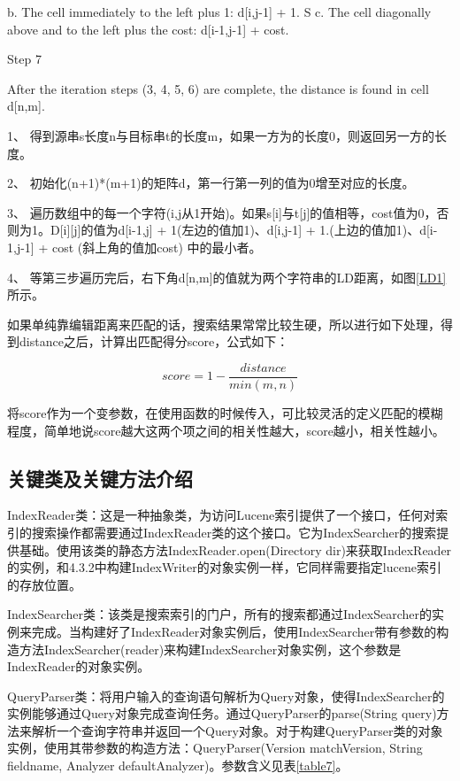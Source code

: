 b. The cell immediately to the left plus 1: d[i,j-1] + 1.
S
c. The cell diagonally above and to the left plus the cost: d[i-1,j-1] + cost.

Step 7

After the iteration steps (3, 4, 5, 6) are complete, the distance is found in cell d[n,m]. 

1、  得到源串s长度n与目标串t的长度m，如果一方为的长度0，则返回另一方的长度。

2、  初始化(n+1)*(m+1)的矩阵d，第一行第一列的值为0增至对应的长度。

3、  遍历数组中的每一个字符(i,j从1开始)。如果s[i]与t[j]的值相等，cost值为0，否则为1。D[i][j]的值为d[i-1,j] + 1(左边的值加1)、d[i,j-1] + 1.(上边的值加1)、d[i-1,j-1] + cost (斜上角的值加cost) 中的最小者。

4、  等第三步遍历完后，右下角d[n,m]的值就为两个字符串的LD距离，如图\ref{LD1}所示。
\newpage
{}

如果单纯靠编辑距离来匹配的话，搜索结果常常比较生硬，所以进行如下处理，得到distance之后，计算出匹配得分score，公式如下：

\[score=1-\frac{distance}{min(m,n)}\] 

将score作为一个变参数，在使用函数的时候传入，可比较灵活的定义匹配的模糊程度，简单地说score越大这两个项之间的相关性越大，score越小，相关性越小。

\subsection{关键类及关键方法介绍}
IndexReader类：这是一种抽象类，为访问Lucene索引提供了一个接口，任何对索引的搜索操作都需要通过IndexReader类的这个接口。它为IndexSearcher的搜索提供基础。使用该类的静态方法IndexReader.open(Directory dir)来获取IndexReader\\的实例，和4.3.2中构建IndexWriter的对象实例一样，它同样需要指定lucene索引的存放位置。

IndexSearcher类：该类是搜索索引的门户，所有的搜索都通过IndexSearcher的实例来完成。当构建好了IndexReader对象实例后，使用IndexSearcher带有参数的构造方法IndexSearcher(reader)来构建IndexSearcher对象实例，这个参数是Index\-Reader的对象实例。

QueryParser类：将用户输入的查询语句解析为Query对象，使得IndexSearcher的实例能够通过Query对象完成查询任务。通过QueryParser的parse(String query)方法来解析一个查询字符串并返回一个Query对象。对于构建QueryParser类的对象实例，使用其带参数的构造方法：QueryParser(Version matchVersion, String fieldname, Analyzer defaultAnalyzer)。参数含义见表\ref{table7}。

